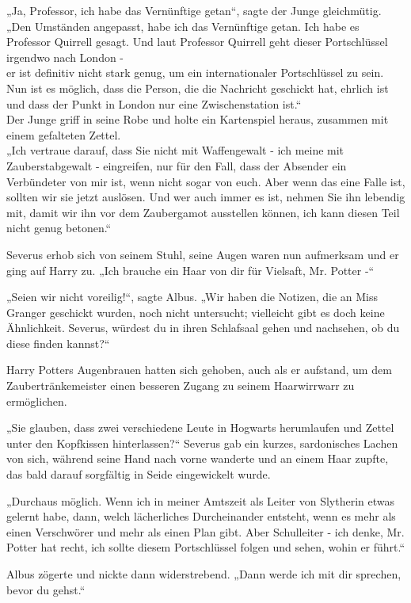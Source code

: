 {„Ja, Professor, ich habe das Vernünftige getan“, sagte der Junge gleichmütig. „Den Umständen angepasst, habe ich das Vernünftige getan. Ich habe es Professor Quirrell gesagt. Und laut Professor Quirrell geht dieser Portschlüssel irgendwo nach London -\\ er ist definitiv nicht stark genug, um ein internationaler Portschlüssel zu sein. Nun ist es möglich, dass die Person, die die Nachricht geschickt hat, ehrlich ist und dass der Punkt in London nur eine Zwischenstation ist.“\\ Der Junge griff in seine Robe und holte ein Kartenspiel heraus, zusammen mit einem gefalteten Zettel.\\ „Ich vertraue darauf, dass Sie nicht mit Waffengewalt - ich meine mit Zauberstabgewalt - eingreifen, nur für den Fall, dass der Absender ein Verbündeter von mir ist, wenn nicht sogar von euch. Aber wenn das eine Falle ist, sollten wir sie jetzt auslösen. Und wer auch immer es ist, nehmen Sie ihn lebendig mit, damit wir ihn vor dem Zaubergamot ausstellen können, ich kann diesen Teil nicht genug betonen.“

Severus erhob sich von seinem Stuhl, seine Augen waren nun aufmerksam und er ging auf Harry zu. „Ich brauche ein Haar von dir für Vielsaft, Mr. Potter -“

„Seien wir nicht voreilig!“, sagte Albus. „Wir haben die Notizen, die an Miss Granger geschickt wurden, noch nicht untersucht; vielleicht gibt es doch keine Ähnlichkeit. Severus, würdest du in ihren Schlafsaal gehen und nachsehen, ob du diese finden kannst?“

Harry Potters Augenbrauen hatten sich gehoben, auch als er aufstand, um dem Zaubertränkemeister einen besseren Zugang zu seinem Haarwirrwarr zu ermöglichen.

„Sie glauben, dass zwei verschiedene Leute in Hogwarts herumlaufen und Zettel unter den Kopfkissen hinterlassen?“ Severus gab ein kurzes, sardonisches Lachen von sich, während seine Hand nach vorne wanderte und an einem Haar zupfte, das bald darauf sorgfältig in Seide eingewickelt wurde.

„Durchaus möglich. Wenn ich in meiner Amtszeit als Leiter von Slytherin etwas gelernt habe, dann, welch lächerliches Durcheinander entsteht, wenn es mehr als einen Verschwörer und mehr als einen Plan gibt. Aber Schulleiter - ich denke, Mr. Potter hat recht, ich sollte diesem Portschlüssel folgen und sehen, wohin er führt.“

Albus zögerte und nickte dann widerstrebend. „Dann werde ich mit dir sprechen, bevor du gehst.“

}
